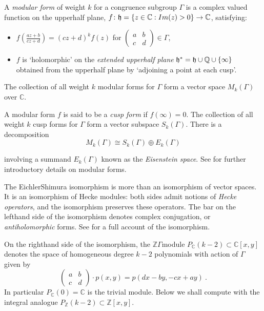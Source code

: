 \documentclass[a4paper,11pt]{report}
\begin{document}
{{A \emph{modular form} of weight $k$ for a congruence subgroup $\Gamma$ is a complex valued function on the upper\texttt{}half plane, $f\colon {\frak{h}}=\{z\in \mathbb C : Im(z)>0\} \rightarrow \mathbb C$, satisfying: 
\begin{itemize}
\item  $\displaystyle f(\frac{az+b}{cz+d}) = (cz+d)^k f(z)$ for $\left(\begin{array}{ll}a&b\\ c &d \end{array}\right) \in \Gamma$, 
\item  $f$ is `holomorphic' on the \emph{extended upper\texttt{}half plane} $\frak{h}^\ast = \frak{h} \cup \mathbb Q \cup \{\infty\}$ obtained from the upper\texttt{}half plane by `adjoining a point at
each cusp'. 
\end{itemize}
 The collection of all weight $k$ modular forms for $\Gamma$ form a vector space $M_k(\Gamma)$ over $\mathbb C$. 

A modular form $f$ is said to be a \emph{cusp form} if $f(\infty)=0$. The collection of all weight $k$ cusp forms for $\Gamma$ form a vector subspace $S_k(\Gamma)$. There is a decomposition 
\[M_k(\Gamma) \cong S_k(\Gamma) \oplus E_k(\Gamma)\]
 

 involving a summand $E_k(\Gamma)$ known as the \emph{Eisenstein space}. See \cite{stein} for further introductory details on modular forms. 

The Eichler\texttt{}Shimura isomorphism is more than an isomorphism
of vector spaces. It is an isomorphism of Hecke modules: both sides admit
notions of \emph{Hecke operators}, and the isomorphism preserves these operators. The bar on the
left\texttt{}hand side of the isomorphism denotes complex
conjugation, or \emph{anti\texttt{}holomorphic} forms. See \cite{wieser} for a full account of the isomorphism. 



 On the right\texttt{}hand side of the isomorphism, the $\mathbb Z\Gamma$\texttt{}module $P_{\mathbb C}(k-2)\subset \mathbb C[x,y]$ denotes the space of homogeneous degree $k-2$ polynomials with action of $\Gamma$ given by 
\[\left(\begin{array}{ll}a&b\\ c &d \end{array}\right)\cdot p(x,y) =
p(dx-by,-cx+ay)\ .\]
 In particular $P_{\mathbb C}(0)=\mathbb C$ is the trivial module. Below we shall compute with the integral analogue $P_{\mathbb Z}(k-2) \subset \mathbb Z[x,y]$. 



}}
\end{document}
